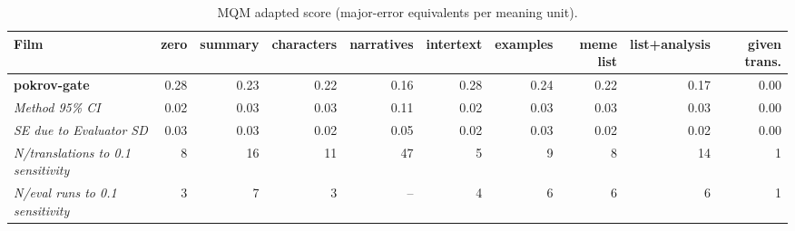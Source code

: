 \begin{table}[ht]
\centering
\begin{adjustbox}{width=\textwidth}
\begin{tabular}{lrrrrrrrr|r}
Film & zero & summary & characters & narratives & intertext & examples & meme list & list+analysis & given trans. \\
\hline
\textbf{pokrov-gate} & 0.28 & 0.23 & 0.22 & 0.16 & 0.28 & 0.24 & 0.22 & 0.17 & 0.00 \\

\emph{Method 95\% CI} & 0.02 & 0.03 & 0.03 & 0.11 & 0.02 & 0.03 & 0.03 & 0.03 & 0.00 \\

\emph{SE due to Evaluator SD} & 0.03 & 0.03 & 0.02 & 0.05 & 0.02 & 0.03 & 0.02 & 0.02 & 0.00 \\

\emph{N/translations to 0.1 sensitivity} & 8 & 16 & 11 & 47 & 5 & 9 & 8 & 14 & 1 \\

\emph{N/eval runs to 0.1 sensitivity} & 3 & 7 & 3 & -- & 4 & 6 & 6 & 6 & 1 \\

\hline
\end{tabular}
\end{adjustbox}
\caption{MQM adapted score (major-error equivalents per meaning unit).}
\label{tab:mqm-method-comparison}
\end{table}
